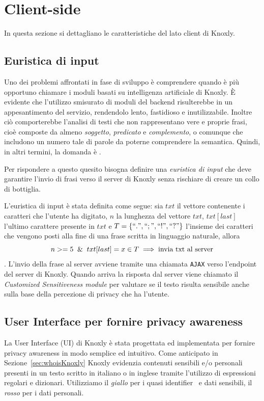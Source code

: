 \section{Client-side}
\label{sec:frontend}
In questa sezione si dettagliano le caratteristiche del lato client di Knoxly.

\subsection{Euristica di input}
\label{ssec:euristicInput}
Uno dei problemi affrontati in fase di sviluppo è comprendere quando è più opportuno chiamare i moduli basati su intelligenza artificiale di Knoxly. È evidente che l'utilizzo smisurato di moduli del backend risulterebbe in un appesantimento del servizio, rendendolo lento, fastidioso e inutilizzabile. Inoltre ciò comporterebbe l'analisi di testi che non rappresentano vere e proprie frasi, cioè composte da almeno \textit{soggetto}, \textit{predicato} e \textit{complemento}, o comunque che includono un numero tale di parole da poterne comprendere la semantica. Quindi, in altri termini, la domanda è\textit{ }.

Per rispondere a questo quesito bisogna definire una \textit{euristica di input} che deve garantire l'invio di frasi verso il server di Knoxly senza rischiare di creare un collo di bottiglia. 

L'euristica di input è stata definita come segue: sia $txt$ il vettore contenente i caratteri che l'utente ha digitato, $n$ la lunghezza del vettore $txt$, $txt[last]$ l'ultimo carattere presente in $txt$ e $T = \{``.", ``;", ``!", ``?"\}$ l'insieme dei caratteri che vengono posti alla fine di una frase scritta in linguaggio naturale, allora
$$ n>=5 \And txt[last] = x \in T \implies \text{invia txt al server}$$.
L'invio della frase al server avviene tramite una chiamata {\tt AJAX} verso l'endpoint del server di Knoxly. Quando arriva la risposta dal server viene chiamato il \textit{Customized Sensitiveness module} per valutare se il testo risulta sensibile anche sulla base della percezione di privacy che ha l'utente.

\subsection{User Interface per fornire privacy awareness}
\label{ssec:ui}


La User Interface (UI) di Knoxly è stata progettata ed implementata per fornire privacy awareness in modo semplice ed intuitivo. Come anticipato in Sezione~\ref{sec:whoisKnoxly} Knoxly evidenzia contenuti sensibili e/o personali presenti in un testo scritto in italiano o in inglese tramite l'utilizzo di espressioni regolari e dizionari. Utilizziamo il \textit{giallo} per i quasi identifier~\cite{} e dati sensibili, il \textit{rosso} per i dati personali. 


